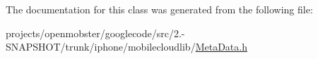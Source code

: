 \-The documentation for this class was generated from the following file\-:\begin{DoxyCompactItemize}
\item 
projects/openmobster/googlecode/src/2.-\/\-S\-N\-A\-P\-S\-H\-O\-T/trunk/iphone/mobilecloudlib/\hyperlink{_meta_data_8h}{\-Meta\-Data.\-h}\end{DoxyCompactItemize}
